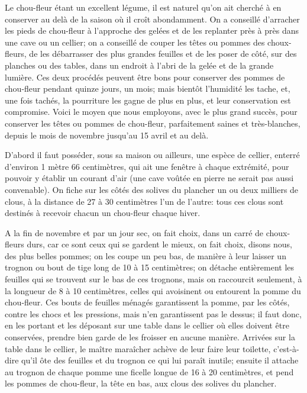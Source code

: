 \documentclass[10pt,a4paper]{book}
\begin{document}
Le chou-fleur étant un excellent légume, il est naturel qu'on ait cherché à en conserver au delà de la saison où il croît abondamment. On a conseillé d'arracher les pieds de chou-fleur à l'approche des gelées et de les replanter près à près dans une cave ou un cellier; on a conseillé de couper les têtes ou pommes des choux-fleurs, de les débarrasser des plus grandes feuilles et de les poser de côté, sur des planches ou des tables, dans un endroit à l'abri de la gelée et de la grande lumière. Ces deux procédés peuvent être bons pour conserver des pommes de chou-fleur pendant quinze jours, un mois; mais bientôt l'humidité les tache, et, une fois tachés, la pourriture les gagne de plus en plus, et leur conservation est compromise. Voici le moyen que nous employons, avec le plus grand succès, pour conserver les têtes ou pommes de chou-fleur, parfaitement saines et très-blanches, depuis le mois de novembre jusqu'au 15 avril et au delà.

D'abord il faut posséder, sous sa maison ou ailleurs, une espèce de cellier, enterré d'environ 1 mètre 66 centimètres, qui ait une fenêtre à chaque extrémité, pour pouvoir y établir un courant d'air (une cave voûtée en pierre ne serait pas aussi convenable). On fiche sur les côtés des solives du plancher un ou deux milliers de clous, à la distance de 27 à 30 centimètres l'un de l'autre: tous ces clous sont destinés à recevoir chacun un chou-fleur chaque hiver.

A la fin de novembre et par un jour sec, on fait choix, dans un carré de choux-fleurs durs, car ce sont ceux qui se gardent le mieux, on fait choix, disons nous, des plus belles pommes; on les coupe un peu bas, de manière à leur laisser un trognon ou bout de tige long de 10 à 15 centimètres; on détache entièrement les feuilles qui se trouvent sur le bas de ces trognons, mais on raccourcit seulement, à la longueur de 8 à 10 centimètres, celles qui avoisinent ou entourent la pomme du chou-fleur. Ces bouts de feuilles ménagés garantissent la pomme, par les côtés, contre les chocs et les pressions, mais n'en garantissent pas le dessus; il faut donc, en les portant et les déposant sur une table dans le cellier où elles doivent être conservées, prendre bien garde de les froisser en aucune manière. Arrivées sur la table dans le cellier, le maître maraîcher achève de leur faire leur toilette, c'est-à-dire qu'il ôte des feuilles et du trognon ce qui lui paraît inutile; ensuite il attache au trognon de chaque pomme une ficelle longue de 16 à 20 centimètres, et pend les pommes de chou-fleur, la tête en bas, aux clous des solives du plancher.
\end{document}
